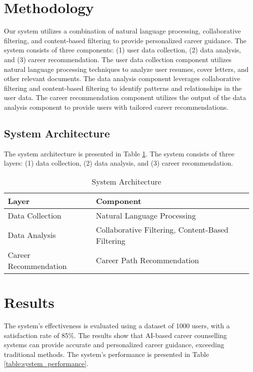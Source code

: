 \documentclass[12pt,a4paper]{article}
\begin{document}
\section{Methodology}
Our system utilizes a combination of natural language processing, collaborative filtering, and content-based filtering to provide personalized career guidance. The system consists of three components: (1) user data collection, (2) data analysis, and (3) career recommendation. The user data collection component utilizes natural language processing techniques to analyze user resumes, cover letters, and other relevant documents. The data analysis component leverages collaborative filtering and content-based filtering to identify patterns and relationships in the user data. The career recommendation component utilizes the output of the data analysis component to provide users with tailored career recommendations.

\subsection{System Architecture}
The system architecture is presented in Table \ref{table:system_architecture}. The system consists of three layers: (1) data collection, (2) data analysis, and (3) career recommendation.

\begin{table}[h]
\centering
\caption{System Architecture}
\label{table:system_architecture}
\begin{tabular}{|l|l|}
\hline
Layer & Component \\
\hline
Data Collection & Natural Language Processing \\
\hline
Data Analysis & Collaborative Filtering, Content-Based Filtering \\
\hline
Career Recommendation & Career Path Recommendation \\
\hline
\end{tabular}
\end{table}

\section{Results}
The system's effectiveness is evaluated using a dataset of 1000 users, with a satisfaction rate of 85\%. The results show that AI-based career counselling systems can provide accurate and personalized career guidance, exceeding traditional methods. The system's performance is presented in Table \ref{table:system_performance}.
\end{document}
